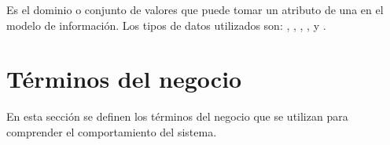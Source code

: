 \begin{description}
     Es el dominio o conjunto de valores que puede tomar un atributo de una  en el modelo de información. Los tipos de datos utilizados son: , , , ,  y .
    

\end{description}


\section{Términos del negocio}
\label{gls:terminosNegocio}
En esta sección se definen los términos del negocio que se utilizan para comprender el comportamiento del sistema.

